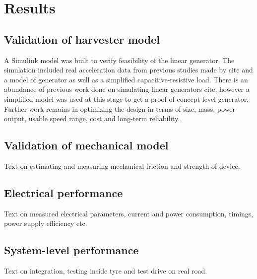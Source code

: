 \section{Results}

\subsection{Validation of harvester model}
A Simulink model was built to verify feasibility of the linear generator. The simulation included real acceleration data from previous studies made by {\color{red} cite} and a model of generator as well as a simplified capacitive-resistive load. There is an abundance of previous work done on simulating linear generators  {\color{red} cite}, however a simplified model was used at this stage to get a proof-of-concept level generator. Further work remains in optimizing the design in terms of size, mass, power output, usable speed range, cost and long-term reliability.

\subsection{Validation of mechanical model}
Text on estimating and measuring mechanical friction and strength of device.

\subsection{Electrical performance}
Text on measured electrical parameters, current and power consumption, timings, power supply efficiency etc.

\subsection{System-level performance}
Text on integration, testing inside tyre and test drive on real road.


